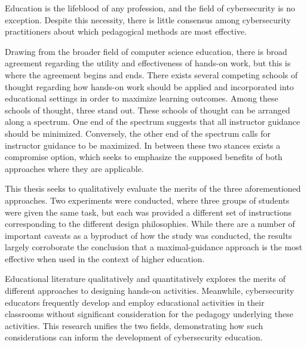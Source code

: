 
\providecommand{\heading}[1]{\section{#1}}
\providecommand{\subheading}[1]{\subsection{#1}}

Education is the lifeblood of any profession, and 
the field of cybersecurity is no exception. 
Despite this necessity, there is little consensus among cybersecurity practitioners about which pedagogical methods are most effective.

Drawing from the broader field of computer science education, there is broad agreement regarding the utility and effectiveness of hands-on work, 
but this is where the agreement begins and ends. 
There exists several competing schools of thought regarding how hands-on work should be applied and incorporated into educational settings in order to maximize learning outcomes. 
Among these schools of thought, three stand out. 
These schools of thought can be arranged along a spectrum. 
One end of the spectrum suggests that all instructor guidance should be minimized. 
Conversely, the other end of the spectrum calls for instructor guidance to be maximized. 
In between these two stances exists a compromise option, which seeks to emphasize the supposed benefits of both approaches where they are applicable.

This thesis seeks to qualitatively evaluate the merits of the three aforementioned approaches. 
Two experiments were conducted, where three groups of students were given the same task, but each was provided a different set of instructions corresponding to the different design philosophies. 
While there are a number of important caveats as a byproduct of how the study was conducted, the results largely corroborate the conclusion that a maximal-guidance approach is the most effective when used in the context of higher education. 

Educational literature qualitatively and quantitatively explores the merits of different approaches to designing hands-on activities. 
Meanwhile, cybersecurity educators frequently develop and employ educational activities in their classrooms without significant consideration for the pedagogy underlying these activities. 
This research unifies the two fields, demonstrating how such considerations can inform the development of cybersecurity education. 
